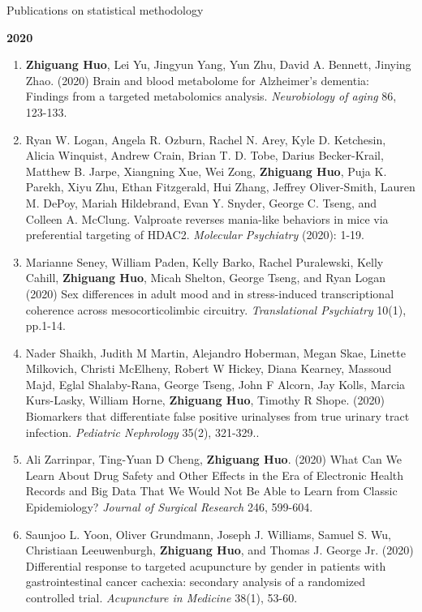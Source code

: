\documentclass{resume} %
\begin{document}
\begin{rSection}{Publications on statistical methodology}
\begin{enumerate}[noitemsep,topsep=0pt, resume]
\end{enumerate}


\textbf{2020}
\begin{enumerate}[noitemsep,topsep=0pt, resume]

\item  {\bf Zhiguang Huo}, Lei Yu, Jingyun Yang, Yun Zhu,  David A. Bennett, Jinying Zhao. (2020)
Brain and blood metabolome for Alzheimer's dementia: Findings from a targeted metabolomics analysis.
\emph{Neurobiology of aging}  86, 123-133.
\label{bioinfo_17} \label{mlapp_4} 

\item
Ryan W. Logan, Angela R. Ozburn, Rachel N. Arey, Kyle D. Ketchesin, Alicia Winquist, Andrew Crain, Brian T. D. Tobe, Darius Becker-Krail, Matthew B. Jarpe, Xiangning Xue, Wei Zong, {\bf Zhiguang Huo}, Puja K. Parekh, Xiyu Zhu, Ethan Fitzgerald, Hui Zhang, Jeffrey Oliver-Smith, Lauren M. DePoy, Mariah Hildebrand, Evan Y. Snyder, George C. Tseng, and Colleen A. McClung. 
Valproate reverses mania-like behaviors in mice via preferential targeting of HDAC2.
\emph{Molecular Psychiatry} (2020): 1-19.
\label{bioinfo_16}


\item 
Marianne Seney, William Paden, Kelly Barko, Rachel Puralewski, Kelly Cahill, {\bf Zhiguang Huo}, Micah Shelton, George Tseng, and Ryan Logan
(2020)
Sex differences in adult mood and in stress-induced transcriptional coherence across mesocorticolimbic circuitry.
\emph{Translational Psychiatry}  10(1), pp.1-14.
\label{bioinfo_15} 


\item
Nader Shaikh, Judith M Martin, Alejandro Hoberman, Megan Skae, Linette Milkovich, Christi McElheny, Robert W Hickey, Diana Kearney, Massoud Majd, Eglal Shalaby-Rana, George Tseng, John F Alcorn, Jay Kolls, Marcia Kurs-Lasky, William Horne, {\bf Zhiguang Huo}, Timothy R Shope.  (2020)
Biomarkers that differentiate false positive urinalyses from true urinary tract infection. 
\emph{Pediatric Nephrology}  35(2), 321-329..
\label{bioinfo_14} \label{mlapp_3} 


\item
Ali Zarrinpar,  Ting-Yuan D Cheng, {\bf Zhiguang Huo}. (2020)
What Can We Learn About Drug Safety and Other Effects in the Era of Electronic Health Records and Big Data That We Would Not Be Able to Learn from Classic Epidemiology?
\emph{Journal of Surgical Research} 246, 599-604.

\item 
Saunjoo L. Yoon, Oliver Grundmann, Joseph J. Williams, Samuel S. Wu, Christiaan Leeuwenburgh, {\bf Zhiguang Huo}, and Thomas J. George Jr. (2020)
Differential response to targeted acupuncture by gender in patients with gastrointestinal cancer cachexia: secondary analysis of a randomized controlled trial.
\emph{Acupuncture in Medicine}  38(1), 53-60.


\end{enumerate}
\end{rSection}
\end{document}
